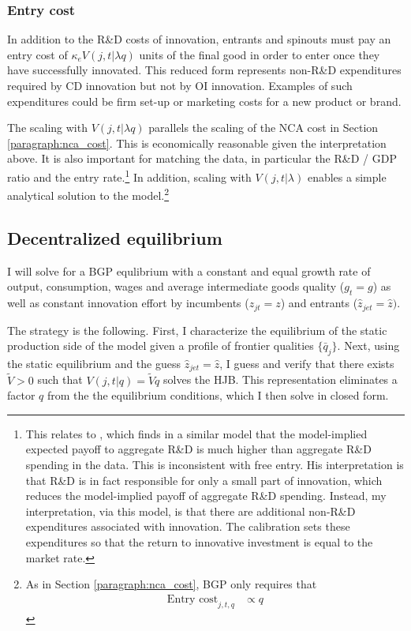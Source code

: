 \documentclass[11pt,english]{article}
\theoremstyle{remark}
\begin{document}
\subsubsection{Entry cost}

In addition to the R\&D costs of innovation, entrants and spinouts must pay an entry cost of $\kappa_{e} V(j,t|\lambda q)$ units of the final good in order to enter once they have successfully innovated. This reduced form represents non-R\&D expenditures required by CD innovation but not by OI innovation. Examples of such expenditures could be firm set-up or marketing costs for a new product or brand.

The scaling with $V(j,t|\lambda q)$ parallels the scaling of the NCA cost in Section \ref{paragraph:nca_cost}. This is economically reasonable given the interpretation above. It is also important for matching the data, in particular the R\&D / GDP ratio and the entry rate.\footnote{This relates to \cite{comin_rd_2004}, which finds in a similar model that the model-implied expected payoff to aggregate R\&D is much higher than aggregate R\&D spending in the data. This is inconsistent with free entry. His interpretation is that R\&D is in fact responsible for only a small part of innovation, which reduces the model-implied payoff of aggregate R\&D spending. Instead, my interpretation, via this model, is that there are additional non-R\&D expenditures associated with innovation. The calibration sets these expenditures so that the return to innovative investment is equal to the market rate.} In addition, scaling with $V(j,t|\lambda)$ enables a simple analytical solution to the model.\footnote{As in Section \ref{paragraph:nca_cost}, BGP only requires that 
\begin{align*}
	\textrm{Entry cost}_{j,t,q} &\propto q
\end{align*}}

\subsection{Decentralized equilibrium}\label{subsec:decentralized_equilibrium}

I will solve for a BGP equlibrium with a constant and equal growth rate of output, consumption, wages and average intermediate goods quality ($g_t = g$) as well as constant innovation effort by incumbents ($z_{jt} = z$) and entrants ($\hat{z}_{jet} = \hat{z})$.  

The strategy is the following. First, I characterize the equilibrium of the static production side of the model given a profile of frontier qualities $\{ \bar{q}_{j}\}$. Next, using the static equilibrium and the guess $\hat{z}_{jet} = \hat{z}$, I guess and verify that there exists $\tilde{V} > 0$ such that $V(j,t|q) = \tilde{V} q$ solves the HJB. This representation eliminates a factor $q$ from the the equilibrium conditions, which I then solve in closed form.
\end{document}
